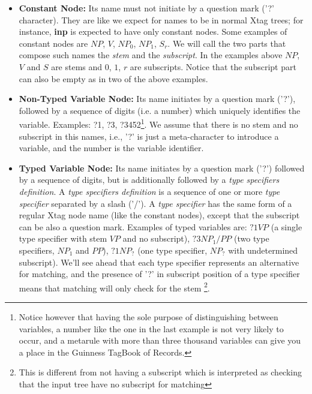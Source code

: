 \begin{itemize}

\item {\bf Constant Node:} Its name must not initiate by a question mark
	('?' character). They are like we expect for names to be in normal
	Xtag trees; for instance, {\bf inp} is expected to have only constant
	nodes. Some examples of constant nodes are $NP$, $V$, $NP_0$, $NP_1$,
	$S_r$. We will call the two parts that compose such names
	the {\it stem} and the {\it subscript}.
	In the examples above  $NP$, $V$ and $S$ are stems and 
	$0$, $1$, $r$ are subscripts. Notice that the
	subscript part can also be empty as in two of the above examples.

\item {\bf Non-Typed Variable Node:} Its name initiates by a question 
	mark ('?'), followed by a sequence of digits (i.e. a number) which 
	uniquely identifies the variable. Examples: ?1, ?3, 
	?3452\footnote{Notice
	however that having the sole purpose of distinguishing between 
	variables, a number like the one in the last example 
	is not very likely
	to occur, and a metarule with more than 
	three thousand variables can give
	you a place in the Guinness TagBook of Records.}. We assume that
	there is no stem and no subscript in this names, i.e., '?' is just
	a meta-character to introduce a variable, and the number is the 
	variable identifier. 

\item {\bf Typed Variable Node:} Its name initiates by a question mark ('?')
	followed by a sequence of digits, but is additionally followed by
	a {\it type specifiers definition}. A {\it type specifiers definition}
	is a sequence of one or more {\it type specifier} separated by a slash
	('/'). A {\it type specifier} has the same form of a regular Xtag node
	name (like the constant nodes), except that the subscript can be also
	a question mark. Examples of typed variables are:
	$?1VP$ (a single type specifier with stem $VP$ and no subscript), 
	$?3NP_1/PP$ (two type specifiers, $NP_1$ and $PP$),
	$?1NP_?$ (one type specifier, $NP_?$ with undetermined subscript). 
	We'll see ahead that each type specifier represents an alternative
	for matching, and the presence of '?' in subscript position of a
	type specifier means that matching will only check for the stem
	\footnote{This is different from not having a subscript which is 
	interpreted as checking that the input tree have no subscript 
	for matching}.
\end{itemize}


